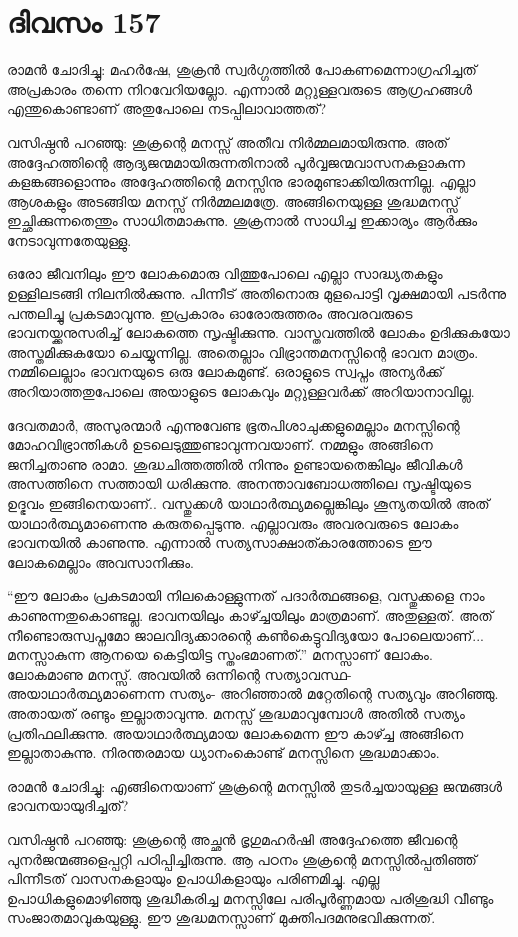 \section{ദിവസം 157}


രാമൻ ചോദിച്ചു: മഹർഷേ, ശുക്രൻ സ്വർഗ്ഗത്തിൽ പോകണമെന്നാഗ്രഹിച്ചത് അപ്രകാരം തന്നെ നിറവേറിയല്ലോ. എന്നാൽ മറ്റുള്ളവരുടെ ആഗ്രഹങ്ങൾ എന്തുകൊണ്ടാണ്‌ അതുപോലെ  നടപ്പിലാവാത്തത്?

വസിഷ്ഠൻ പറഞ്ഞു: ശുക്രന്റെ മനസ്സ് അതീവ നിർമ്മലമായിരുന്നു. അത് അദ്ദേഹത്തിന്റെ ആദ്യജന്മമായിരുന്നതിനാൽ പൂർവ്വജന്മവാസനകളാകുന്ന കളങ്കങ്ങളൊന്നും അദ്ദേഹത്തിന്റെ മനസ്സിനു ഭാരമുണ്ടാക്കിയിരുന്നില്ല. എല്ലാ ആശകളും അടങ്ങിയ മനസ്സ് നിർമ്മലമത്രേ. അങ്ങിനെയുള്ള ശുദ്ധമനസ്സ് ഇച്ഛിക്കുന്നതെന്തും സാധിതമാകുന്നു. ശുക്രനാൽ സാധിച്ച ഇക്കാര്യം ആർക്കും നേടാവുന്നതേയുള്ളു.

ഒരോ ജീവനിലും ഈ ലോകമൊരു വിത്തുപോലെ എല്ലാ സാദ്ധ്യതകളും ഉള്ളിലടങ്ങി നിലനിൽക്കുന്നു. പിന്നീട് അതിനൊരു മുളപൊട്ടി വൃക്ഷമായി പടർന്നു പന്തലിച്ചു  പ്രകടമാവുന്നു. ഇപ്രകാരം ഓരോരുത്തരം അവരവരുടെ ഭാവനയ്ക്കനുസരിച്ച് ലോകത്തെ സൃഷ്ടിക്കുന്നു. വാസ്തവത്തിൽ ലോകം ഉദിക്കുകയോ അസ്തമിക്കുകയോ ചെയ്യുന്നില്ല. അതെല്ലാം വിഭ്രാന്തമനസ്സിന്റെ ഭാവന മാത്രം. നമ്മിലെല്ലാം ഭാവനയുടെ ഒരു ലോകമുണ്ട്. ഒരാളുടെ സ്വപ്നം അന്യർക്ക് അറിയാത്തതുപോലെ അയാളുടെ ലോകവും മറ്റുള്ളവർക്ക് അറിയാനാവില്ല.

ദേവതമാർ, അസുരന്മാർ എന്നുവേണ്ട ഭൂതപിശാചുക്കളുമെല്ലാം മനസ്സിന്റെ മോഹവിഭ്രാന്തികൾ ഉടലെടുത്തുണ്ടാവുന്നവയാണ്. നമ്മളും അങ്ങിനെ ജനിച്ചതാണു രാമാ. ശുദ്ധചിത്തത്തിൽ നിന്നും ഉണ്ടായതെങ്കിലും ജീവികൾ അസത്തിനെ സത്തായി ധരിക്കുന്നു. അനന്താവബോധത്തിലെ സൃഷ്ടിയുടെ ഉദ്ഭവം ഇങ്ങിനെയാണ്‌.. വസ്തുക്കൾ യാഥാർത്ഥ്യമല്ലെങ്കിലും ശൂന്യതയിൽ അത് യാഥാർത്ഥ്യമാണെന്നു കരുതപ്പെടുന്നു. എല്ലാവരും അവരവരുടെ ലോകം ഭാവനയിൽ കാണുന്നു. എന്നാൽ സത്യസാക്ഷാത്കാരത്തോടെ ഈ ലോകമെല്ലാം അവസാനിക്കും.

“ഈ ലോകം പ്രകടമായി നിലകൊള്ളുന്നത് പദാർത്ഥങ്ങളെ, വസ്തുക്കളെ നാം  കാണുന്നതുകൊണ്ടല്ല. ഭാവനയിലും കാഴ്ച്ചയിലും മാത്രമാണ്‌. അതുള്ളത്. അത് നീണ്ടൊരുസ്വപ്നമോ ജാലവിദ്യക്കാരന്റെ കൺകെട്ടുവിദ്യയോ പോലെയാണ്‌... മനസ്സാകുന്ന ആനയെ കെട്ടിയിട്ട സ്തംഭമാണത്.” മനസ്സാണ്‌ ലോകം. ലോകമാണു മനസ്സ്. അവയിൽ ഒന്നിന്റെ സത്യാവസ്ഥ- അയാഥാർത്ഥ്യമാണെന്ന സത്യം- അറിഞ്ഞാൽ മറ്റേതിന്റെ സത്യവും അറിഞ്ഞു. അതായത് രണ്ടും ഇല്ലാതാവുന്നു. മനസ്സ് ശുദ്ധമാവുമ്പോൾ അതിൽ സത്യം പ്രതിഫലിക്കുന്നു. അയാഥാർത്ഥ്യമായ ലോകമെന്ന ഈ കാഴ്ച്ച അങ്ങിനെ ഇല്ലാതാകുന്നു. നിരന്തരമായ ധ്യാനംകൊണ്ട് മനസ്സിനെ ശുദ്ധമാക്കാം.

രാമൻ ചോദിച്ചു: എങ്ങിനെയാണ്‌ ശുക്രന്റെ മനസ്സിൽ തുടർച്ചയായുള്ള ജന്മങ്ങൾ ഭാവനയായുദിച്ചത്?

വസിഷ്ഠൻ പറഞ്ഞു: ശുക്രന്റെ അച്ഛൻ ഭൃഗുമഹർഷി അദ്ദേഹത്തെ ജീവന്റെ പുനർജന്മങ്ങളെപ്പറ്റി പഠിപ്പിച്ചിരുന്നു. ആ പഠനം ശുക്രന്റെ മനസ്സിൽപ്പതിഞ്ഞ് പിന്നീടത് വാസനകളായും ഉപാധികളായും പരിണമിച്ചു. എല്ല ഉപാധികളുമൊഴിഞ്ഞു ശുദ്ധീകരിച്ച മനസ്സിലേ പരിപൂർണ്ണമായ പരിശുദ്ധി വീണ്ടും സംജാതമാവുകയുള്ളു. ഈ ശുദ്ധമനസ്സാണ്‌ മുക്തിപദമനുഭവിക്കുന്നത്. 

